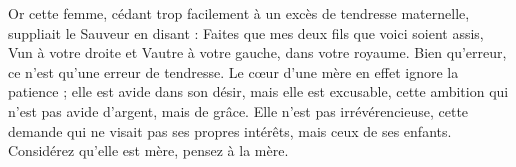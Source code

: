 Or cette femme, cédant trop facilement à un excès de tendresse maternelle, suppliait le Sauveur en disant : Faites que mes deux fils que voici soient assis, Vun à votre droite et Vautre à votre gauche, dans votre royaume. Bien qu’erreur, ce n’est qu’une erreur de tendresse. Le cœur d’une mère en effet ignore la patience ; elle est avide dans son désir, mais elle est excusable, cette ambition qui n’est pas avide d’argent, mais de grâce. Elle n’est pas irrévérencieuse, cette demande qui ne visait pas ses propres intérêts, mais ceux de ses enfants. Considérez qu’elle est mère, pensez à la mère.
